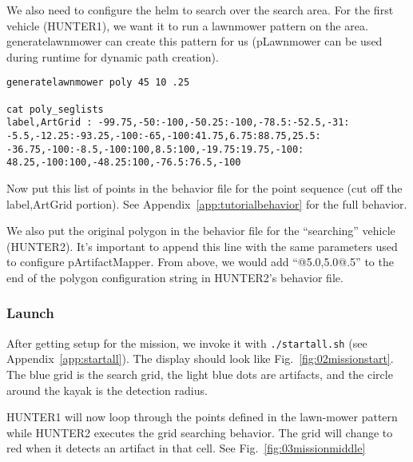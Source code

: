 We also need to configure the helm to search over the search area.  For the first vehicle (HUNTER1), we want it to run a lawnmower pattern on the area.  generatelawnmower can create this pattern for us (pLawnmower can be used during runtime for dynamic path creation).

\scriptsize
\begin{verbatim}
generatelawnmower poly 45 10 .25

cat poly_seglists
label,ArtGrid : -99.75,-50:-100,-50.25:-100,-78.5:-52.5,-31:
-5.5,-12.25:-93.25,-100:-65,-100:41.75,6.75:88.75,25.5:
-36.75,-100:-8.5,-100:100,8.5:100,-19.75:19.75,-100:
48.25,-100:100,-48.25:100,-76.5:76.5,-100
\end{verbatim}
\normalsize

Now put this list of points in the behavior file for the point sequence (cut off the label,ArtGrid portion).  See Appendix~\ref{app:tutorialbehavior} for the full behavior.  

We also put the original polygon in the behavior file for the ``searching'' vehicle (HUNTER2).  It's important to append this line with the same parameters used to configure pArtifactMapper.  From above, we would add ``@5.0,5.0@.5'' to the end of the polygon configuration string in HUNTER2's behavior file.


\subsubsection{Launch}
\label{ex:tutorial:launch}
After getting setup for the mission, we invoke it with {\tt ./startall.sh} (see Appendix~\ref{app:startall}).  The display should look like Fig.~\ref{fig:02missionstart}.  The blue grid is the search grid, the light blue dots are artifacts, and the circle around the kayak is the detection radius.


HUNTER1 will now loop through the points defined in the lawn-mower pattern while HUNTER2 executes the grid searching behavior.  The grid will change to red when it detects an artifact in that cell.  See Fig.~\ref{fig:03missionmiddle}


